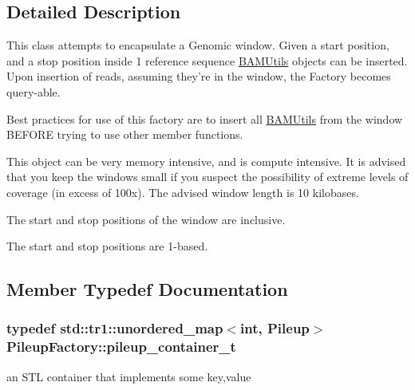 \subsection{Detailed Description}
This class attempts to encapsulate a Genomic window. Given a start position, and a stop position inside 1 reference sequence \hyperlink{class_b_a_m_utils}{BAMUtils} objects can be inserted. Upon insertion of reads, assuming they're in the window, the Factory becomes query-\/able.

Best practices for use of this factory are to insert all \hyperlink{class_b_a_m_utils}{BAMUtils} from the window BEFORE trying to use other member functions.

This object can be very memory intensive, and is compute intensive. It is advised that you keep the windows small if you suspect the possibility of extreme levels of coverage (in excess of 100x). The advised window length is 10 kilobases.

The start and stop positions of the window are inclusive.

The start and stop positions are 1-\/based. 

\subsection{Member Typedef Documentation}
\hypertarget{class_pileup_factory_ae4c0b96c035216ba005467e2d5fc3397}{
\subsubsection[{pileup\_\-container\_\-t}]{\setlength{\rightskip}{0pt plus 5cm}typedef std::tr1::unordered\_\-map$<$int, {\bf Pileup}$>$ {\bf PileupFactory::pileup\_\-container\_\-t}}}
\label{class_pileup_factory_ae4c0b96c035216ba005467e2d5fc3397}
an STL container that implements some key,value 

